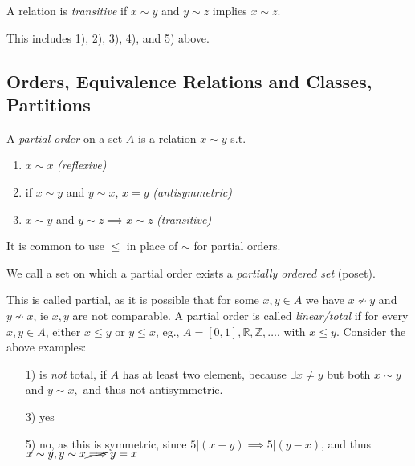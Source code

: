 \documentclass[12pt,oneside]{article}
\begin{document}
\begin{definition}[Transitive]
  A relation is \emph{transitive} if $x \sim y$ and $y \sim z$ implies $x \sim z$.

  This includes 1), 2), 3), 4), and 5) above.
\end{definition}
\subsection{Orders, Equivalence Relations and Classes, Partitions}
\begin{definition}
  A \emph{partial order} on a set $A$ is a relation $x \sim y$ s.t.
  \begin{enumerate}
    \item $x \sim x$ \textit{(reflexive)}
    \item if $x \sim y$ and $y \sim x$, $x = y$ \textit{(antisymmetric)}
    \item $x \sim y$ and $y \sim z \implies x \sim z$ \textit{(transitive)}
  \end{enumerate}
  It is common to use $\leq$ in place of $\sim$ for partial orders.

  We call a set on which a partial order exists a \emph{partially ordered set} (poset).

  This is called partial, as it is possible that for some $x,y \in A$ we have $x \nsim y$ and $y \nsim x$, ie $x,y$ are not comparable. A partial order is called \emph{linear/total} if for every $x,y\in A$, either $x \leq y$ or $y \leq x$, eg., $A = [0,1], \mathbb{R}, \mathbb{Z}, \dots$, with $x \leq y$. Consider the above examples:

  \begin{itemize}
    \item[1)] is \emph{not} total, if $A$ has at least two element, because $\exists x \neq y$ but both $x \sim y$ and $y \sim x,$ and thus not antisymmetric.
    \item[3)] yes
    \item[5)] no, as this is symmetric, since $5 | (x-y) \implies 5 | (y-x)$, and thus $x \sim y, y \sim x \cancel{\implies} y = x$
  \end{itemize}
\end{definition}
\end{document}
